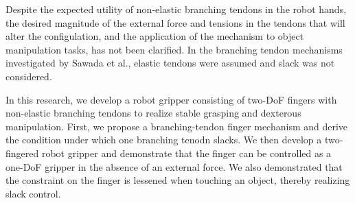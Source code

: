 \documentclass{llncs}
\begin{document}
Despite the expected utility of non-elastic branching tendons in the robot hands,
the desired magnitude of the external force and tensions in the tendons that will alter the configulation,
and the application of the mechanism to object manipulation tasks,
has not been clarified.
In the branching tendon mechanisms investigated by Sawada et al.,
elastic tendons were assumed and slack was not considered\cite{Sawada2012}.

In this research, we develop a robot gripper consisting of two-DoF fingers
with non-elastic branching tendons to realize stable grasping and dexterous manipulation.
First, we propose a branching-tendon finger mechanism
and derive the condition under which one branching tenodn slacks.
We then develop a two-fingered robot gripper
and demonstrate that the finger can be controlled as a one-DoF gripper
in the absence of an external force.
We also demonstrated that the constraint on the finger is lessened when touching an object, thereby realizing slack control.
\end{document}
